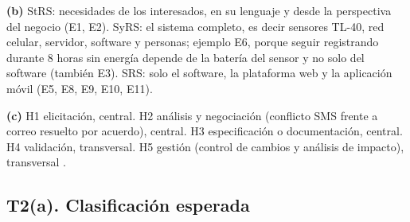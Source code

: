 \documentclass[11pt]{article}
\newcommand{\subseccion}[1]{\subsection{\textcolor{midblue}{#1}}}
\begin{document}
\textbf{(b)} StRS: necesidades de los interesados, en su lenguaje y desde la perspectiva del negocio (E1, E2). SyRS: el sistema completo, es decir sensores TL-40, red celular, servidor, software y personas; ejemplo E6, porque seguir registrando durante 8 horas sin energía depende de la batería del sensor y no solo del software (también E3). SRS: solo el software, la plataforma web y la aplicación móvil (E5, E8, E9, E10, E11).



\textbf{(c)} H1 elicitación, central. H2 análisis y negociación (conflicto SMS frente a correo resuelto por acuerdo), central. H3 especificación o documentación, central. H4 validación, transversal. H5 gestión (control de cambios y análisis de impacto), transversal \citep{pohl_2025}.



\subseccion{T2(a). Clasificación esperada}
\end{document}
